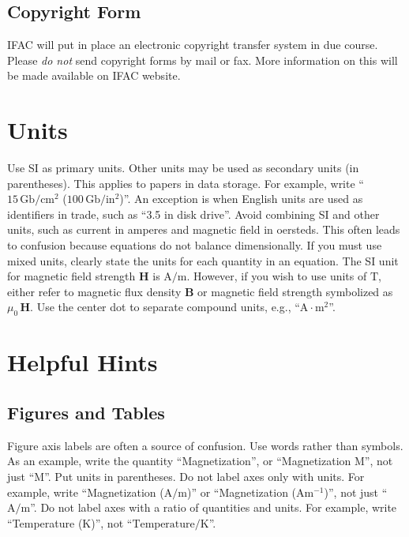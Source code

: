 \documentclass{ifacconf}
\begin{document}
\subsection{Copyright Form}

IFAC will put in place an electronic copyright transfer system in due
course. Please \emph{do not} send copyright forms by mail or fax. More
information on this will be made available on IFAC website.


\section{Units}

Use SI as primary units. Other units may be used as secondary units
(in parentheses). This applies to papers in data storage. For example,
write ``$15\,\mathrm{Gb}/\mathrm{cm}^2$ ($100\,\mathrm{Gb}/\mathrm{in}^2$)''. 
An exception is when
English units are used as identifiers in trade, such as ``3.5 in
disk drive''. Avoid combining SI and other units, such as current in
amperes and magnetic field in oersteds. This often leads to confusion
because equations do not balance dimensionally. If you must use mixed
units, clearly state the units for each quantity in an equation.  The
SI unit for magnetic field strength $\mathbf{H}$ is $\mathrm{A}/\mathrm{m}$. However, if you wish to
use units of $\mathrm{T}$, either refer to magnetic flux density $\mathbf{B}$ or
magnetic field strength symbolized as $\mu_0\,\mathbf{H}$. Use the center dot to
separate compound units, e.g., ``$\mathrm{A} \cdot \mathrm{m}^2$''.

\section{Helpful Hints}

\subsection{Figures and Tables}

Figure axis labels are often a source of confusion. Use words rather
than symbols. As an example, write the quantity ``Magnetization'', or
``Magnetization M'', not just ``M''. Put units in parentheses. Do not
label axes only with units.  For example, write ``Magnetization
($\mathrm{A}/\mathrm{m}$)'' or ``Magnetization ($\mathrm{A} \mathrm{m}^{-1}$)'', not just
 ``$\mathrm{A}/\mathrm{m}$''. Do not
label axes with a ratio of quantities and units. For example, write
``Temperature ($\mathrm{K}$)'', not ``$\mbox{Temperature}/\mathrm{K}$''.
\end{document}

